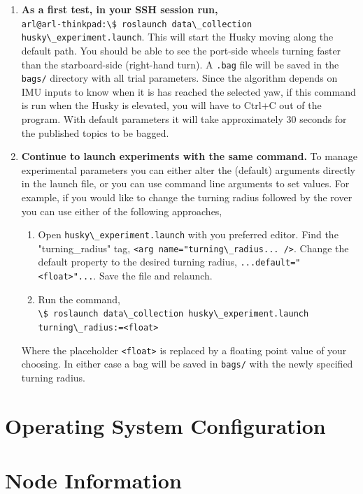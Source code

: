\documentclass[
	12pt, %
]{fphw}
\newcommand{\code}[1]{\colorbox{light-gray}{\lstinline|#1|}}
\begin{document}
\begin{enumerate}

\item \textbf{As a first test, in your SSH session run,} \\ \code{arl@arl-thinkpad:\$ roslaunch data\_collection husky\_experiment.launch}. This will start the Husky moving along the default path. You should be able to see the port-side wheels turning faster than the starboard-side (right-hand turn). A \code{.bag} file will be saved in the \code{bags/} directory with all trial parameters. Since the algorithm depends on IMU inputs to know when it is has reached the selected yaw, if this command is run when the Husky is elevated, you will have to Ctrl+C out of the program. With default parameters it will take approximately 30 seconds for the published topics to be bagged.

\item \textbf{Continue to launch experiments with the same command.} To manage experimental parameters you can either alter the (default) arguments directly in the launch file, or you can use command line arguments to set values. For example, if you would like to change the turning radius followed by the rover you can use either of the following approaches,
\begin{enumerate}
	\item Open \code{husky\_experiment.launch} with you preferred editor. Find the "turning\_radius" tag, \code{<arg name="turning\_radius... />}. Change the default property to the desired turning radius, \code{...default="<float>"...}. Save the file and relaunch.
	
	\item Run the command, \\ \code{\$ roslaunch data\_collection husky\_experiment.launch turning\_radius:=<float>}
\end{enumerate}

Where the placeholder \code{<float>} is replaced by a floating point value of your choosing. In either case a bag will be saved in \code{bags/} with the newly specified turning radius.

\end{enumerate}


\cleardoublepage
\appendix

\section{Operating System Configuration}
\label{app:OperatingSystemConfiguration}

\section{Node Information}
\label{app:NodeInformation}
\end{document}
